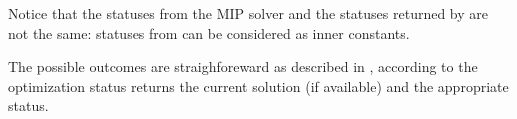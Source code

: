 Notice that the statuses from the MIP solver and the statuses returned by  are not the same: statuses from  can be 
considered as inner constants. 

The possible outcomes are straighforeward as described in , according to the optimization status  returns the current
solution (if available) and the appropriate status. 